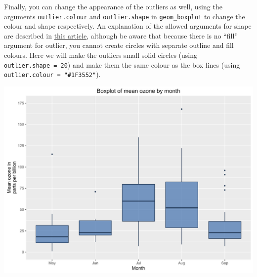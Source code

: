 \documentclass[]{article}
\newenvironment{Shaded}{\begin{snugshade}}{\end{snugshade}}
\newcommand{\KeywordTok}[1]{\textcolor[rgb]{0.13,0.29,0.53}{\textbf{{#1}}}}
\newcommand{\DataTypeTok}[1]{\textcolor[rgb]{0.13,0.29,0.53}{{#1}}}
\newcommand{\DecValTok}[1]{\textcolor[rgb]{0.00,0.00,0.81}{{#1}}}
\newcommand{\FloatTok}[1]{\textcolor[rgb]{0.00,0.00,0.81}{{#1}}}
\newcommand{\CharTok}[1]{\textcolor[rgb]{0.31,0.60,0.02}{{#1}}}
\newcommand{\StringTok}[1]{\textcolor[rgb]{0.31,0.60,0.02}{{#1}}}
\newcommand{\NormalTok}[1]{{#1}}
\begin{document}
Finally, you can change the appearance of the outliers as well, using
the arguments \texttt{outlier.colour} and \texttt{outlier.shape} in
\texttt{geom\_boxplot} to change the colour and shape respectively. An
explanation of the allowed arguments for shape are described in
\href{http://sape.inf.usi.ch/quick-reference/ggplot2/shape}{this
article}, although be aware that because there is no ``fill'' argument
for outlier, you cannot create circles with separate outline and fill
colours. Here we will make the outliers small solid circles (using
\texttt{outlier.shape\ =\ 20}) and make them the same colour as the box
lines (using \texttt{outlier.colour\ =\ "\#1F3552"}).

\begin{Shaded}
\end{Shaded}

\begin{center}\includegraphics{0_all_posts_pdf/box_9-1} \end{center}
\end{document}
